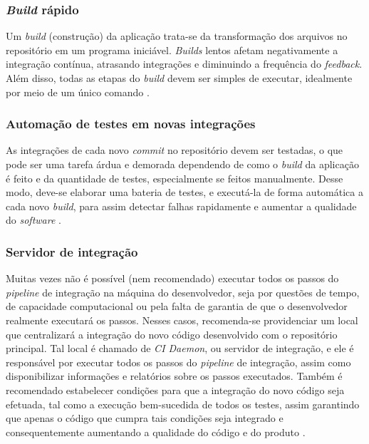
\subsubsection{\emph{Build} rápido}
Um \emph{build} (construção) da aplicação trata-se da transformação dos arquivos no repositório em um programa iniciável. \emph{Builds} lentos afetam negativamente a integração contínua, atrasando integrações e diminuindo a frequência do \emph{feedback}. Além disso, todas as etapas do \emph{build} devem ser simples de executar, idealmente por meio de um único comando \cite{martin-fowler-continuous-integration}.


\subsubsection{Automação de testes em novas integrações}
As integrações de cada novo \emph{commit} no repositório devem ser testadas, o que pode ser uma tarefa árdua e demorada dependendo de como o \emph{build} da aplicação é feito e da quantidade de testes, especialmente se feitos manualmente. Desse modo, deve-se elaborar uma bateria de testes, e executá-la de forma automática a cada novo \emph{build}, para assim detectar falhas rapidamente e aumentar a qualidade do \emph{software} \cite{gitlab-ci-cd,martin-fowler-continuous-integration}.


\subsubsection{Servidor de integração}\label{subsecao-servidor-de-integracao}
Muitas vezes não é possível (nem recomendado) executar todos os passos do \emph{pipeline} de integração na máquina do desenvolvedor, seja por questões de tempo, de capacidade computacional ou pela falta de garantia de que o desenvolvedor realmente executará os passos. Nesses casos, recomenda-se providenciar um local que centralizará a integração do novo código desenvolvido com o repositório principal. Tal local é chamado de \emph{CI Daemon}, ou servidor de integração, e ele é responsável por executar todos os passos do \emph{pipeline} de integração, assim como disponibilizar informações e relatórios sobre os passos executados. Também é recomendado estabelecer condições para que a integração do novo código seja efetuada, tal como a execução bem-sucedida de todos os testes, assim garantindo que apenas o código que cumpra tais condições seja integrado e consequentemente aumentando a qualidade do código e do produto \cite{martin-fowler-continuous-integration,continuous-delivery-jez-humble}.

